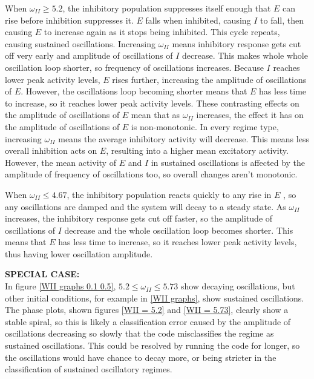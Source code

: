 \documentclass[10pt]{article}
\begin{document}
\begin{flushleft}
\begin{flushleft}

When $\omega_{II} \geq 5.2$, the inhibitory population suppresses itself enough that $E$ can rise before inhibition suppresses it. $E$ falls when inhibited, causing $I$ to fall, then causing $E$ to increase again as it stops being inhibited. This cycle repeats, causing sustained oscillations. Increasing $\omega_{II}$ means inhibitory response gets cut off very early and amplitude of oscillations of $I$ decrease. This makes whole whole oscillation loop shorter, so frequency of oscillations increases. Because $I$ reaches lower peak activity levels, $E$ rises further, increasing the amplitude of oscillations of $E$. However, the oscillations loop becoming shorter means that $E$ has less time to increase, so it reaches lower peak activity levels. These contrasting effects on the amplitude of oscillations of $E$ mean that as $\omega_{II}$ increases, the effect it has on the amplitude of oscillations of $E$ is non-monotonic. In every regime type, increasing $\omega_{II}$ means the average inhibitory activity will decrease. This means less overall inhibition acts on $E$, resulting into a higher mean excitatory activity. However, the mean activity of $E$ and $I$ in sustained oscillations is affected by the amplitude of frequency of oscillations too, so overall changes aren't monotonic.
\newline

When $\omega_{II} \leq 4.67$, the inhibitory population reacts quickly to any rise in $E$ , so any oscillations are damped and the system will decay to a steady state. As $\omega_{II}$ increases, the inhibitory response gets cut off faster, so the amplitude of oscillations of $I$ decrease and the whole oscillation loop becomes shorter. This means that $E$ has less time to increase, so it reaches lower peak activity levels, thus having lower oscillation amplitude.
\end{flushleft}

\begin{flushleft}
\textbf{SPECIAL CASE:} \\

In figure \ref{WII graphs 0.1 0.5}, $5.2 \leq \omega_{II} \leq 5.73$ show decaying oscillations, but other initial conditions, for example in \ref{WII graphs}, show sustained oscillations. The phase plots, shown figures \ref{WII = 5.2} and \ref{WII = 5.73}, clearly show a stable spiral, so this is likely a classification error caused by the amplitude of oscillations decreasing so slowly that the code misclassifies the regime as sustained oscillations. This could be resolved by running the code for longer, so the oscillations would have chance to decay more, or being stricter in the classification of sustained oscillatory regimes.
\end{flushleft}


\end{flushleft}
\end{document}
